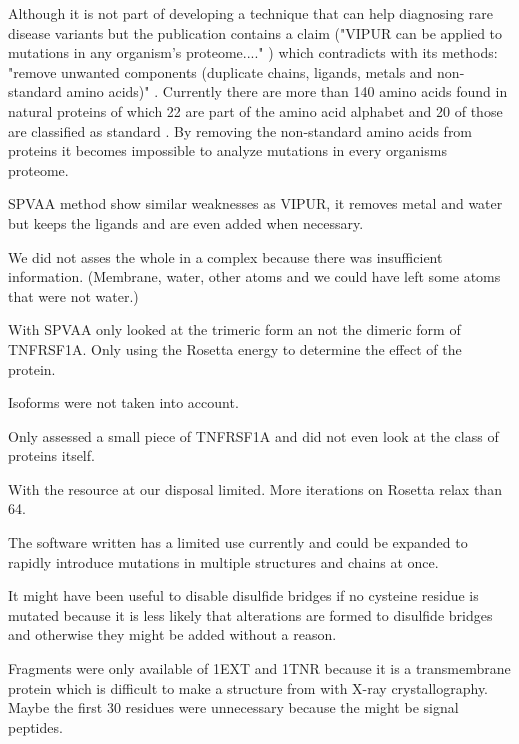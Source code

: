 Although it is not part of developing a technique that can help diagnosing rare disease variants but the publication contains a claim ("VIPUR can be applied to mutations in any organism’s proteome...." \cite{}) which contradicts with its methods: "remove unwanted components (duplicate chains, ligands, metals and non-standard amino acids)" \cite{}. Currently there are more than 140 amino acids found in natural proteins of which 22 are part of the amino acid alphabet and 20 of those are classified as standard \cite{}. By removing the non-standard amino acids from proteins it becomes impossible to analyze mutations in every organisms proteome.



SPVAA method show similar weaknesses as VIPUR, it removes metal and water but keeps the ligands and are even added when necessary.

We did not asses the whole in a complex because there was insufficient information. (Membrane, water, other atoms and we could have left some atoms that were not water.)

With SPVAA only looked at the trimeric form an not the dimeric form of TNFRSF1A.
Only using the Rosetta energy to determine the effect of the protein.

Isoforms were not taken into account.

Only assessed a small piece of TNFRSF1A and did not even look at the class of proteins itself.

With the resource at our disposal  limited.
More iterations on Rosetta relax than 64\cite{}.

The software written has a limited use currently and could be expanded to rapidly introduce mutations in multiple structures and chains at once.

It might have been useful to disable disulfide bridges if no cysteine residue is mutated because it is less likely that alterations are formed to disulfide bridges and otherwise they might be added without a reason.

Fragments were only available of 1EXT and 1TNR because it is a transmembrane protein which is difficult to make a structure from with X-ray crystallography.
Maybe the first 30 residues were unnecessary because the might be signal peptides. 

